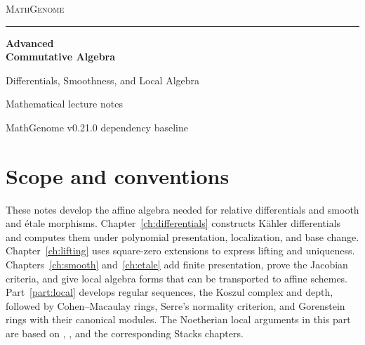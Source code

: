\documentclass[11pt,oneside,openany]{book}
\theoremstyle{definition}
\theoremstyle{remark}
\begin{document}
\frontmatter
\hypersetup{pageanchor=false}
\begin{titlepage}
\thispagestyle{empty}
\begin{flushleft}
\vspace*{0.65in}
{\large\scshape\color{deepgreen}MathGenome\par}
\vspace{0.35in}
{\color{rulegreen}\rule{0.94\textwidth}{0.65pt}\par}
\vspace{0.43in}
{\color{ink}\fontsize{36}{42}\selectfont\bfseries
Advanced\\[4pt] Commutative Algebra\par}
\vspace{0.25in}
{\color{deepgreen}\Large Differentials, Smoothness, and Local Algebra\par}
\vfill
{\large Mathematical lecture notes\par}
\vspace{0.10in}
{\normalsize MathGenome v0.21.0 dependency baseline\par}
\vspace*{0.45in}
\end{flushleft}
\end{titlepage}
\hypersetup{pageanchor=true}

\tableofcontents

\chapter*{Scope and conventions}

These notes develop the affine algebra needed for relative differentials and
smooth and \'{e}tale morphisms. Chapter~\ref{ch:differentials} constructs
K\"ahler differentials and computes them under polynomial presentation,
localization, and base change. Chapter~\ref{ch:lifting} uses square-zero
extensions to express lifting and uniqueness. Chapters~\ref{ch:smooth}
and~\ref{ch:etale} add finite presentation, prove the Jacobian criteria,
and give local algebra forms that can be transported to affine schemes.
Part~\ref{part:local} develops regular sequences, the Koszul complex
and depth, followed by Cohen--Macaulay rings, Serre's normality
criterion, and Gorenstein rings with their canonical modules.
The Noetherian local arguments in this part are based on
\cite[Chapters 17, 18, and 21]{eisenbud},
\cite[Chapters 1--3]{brunsherzog}, and the corresponding Stacks chapters.
\end{document}
